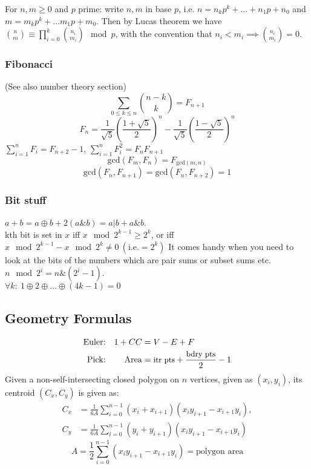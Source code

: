 \documentclass[
	a4paper,
	landscape,
	10pt,
]{article}
\begin{document}
\begin{multicols}{3}
		For $n, m \geq 0$ and $p$ prime: write $n, m$ in base $p$, i.e.
		$n = n_k p^k + \dots + n_1 p + n_0$ and $m = m_k p^k + \dots m_1 p + m_0$. Then
		by Lucas theorem we have $\binom{n}{m} \equiv \prod_{i=0}^k \binom{n_i}{m_i}
		\mod p$, with the convention that $n_i < m_i \implies \binom{n_i}{m_i} =0$.

		\subsubsection*{Fibonacci} (See also number theory section) \\
 		$$\sum_{0 \leq k \leq n} \binom{n-k}{k} = F_{n+1}$$ 
		$$F_n = \frac{1}{\sqrt{5}} \left(\frac{1+\sqrt{5}}{2}\right)^n - \frac{1}{\sqrt{5}}\left(\frac{1-\sqrt{5}}{2}\right)^n$$
		$\sum_{i=1}^{n} {F_i} = F_{n+2}-1$, $\sum_{i=1}^{n} {F_i^2} = F_{n}F_{n+1}$
		$$\text{gcd}(F_m, F_n) = F_{\text{gcd}(m, n)}$$
		$$\text{gcd}(F_n, F_{n+1}) = \text{gcd}(F_n, F_{n+2}) = 1$$

		\subsubsection*{Bit stuff} $a + b = a \oplus b + 2(a\&b) = a | b + a\&b$. \\
		kth bit is set in $x$ iff $x \mod 2^{k-1} \geq 2^k$, or iff $x \mod 2^{k-1}  - x \mod 2^k \neq 0~(\text{i.e.} = 2^k)$ It comes handy when you need to look at the bits of the numbers which are pair sums or subset sums etc. \\
		$n \mod 2^i = n\&(2^i-1)$. \\
		$\forall k:~ 1 \oplus 2 \oplus \hdots \oplus (4k-1) = 0$


		\subsection{Geometry Formulas}
		\begin{align*}
			\textrm{Euler:}&&  1 + CC &= V - E + F\\
            \textrm{Pick:}&& \textrm{Area} &= {\small \textrm{itr pts}
            + \frac{\textrm{bdry pts}}2 - 1}
		\end{align*}
		Given a non-self-intersecting closed polygon on $n$ vertices, given as $(x_i, y_i)$, its centroid $(C_x, C_y)$ is given as:
		\begin{align*}
			C_x &= \frac{1}{6A} \sum_{i = 0}^{n - 1} (x_i + x_{i+1}) (x_i y_{i+1} - x_{i+1} y_i), \\
			C_y &= \frac{1}{6A} \sum_{i = 0}^{n - 1} (y_i + y_{i+1}) (x_i y_{i+1} - x_{i+1} y_i)
		\end{align*}
		\begin{equation*}
			A = \frac{1}{2} \sum_{i = 0}^{n - 1} (x_i y_{i+1} - x_{i+1} y_i) = \textrm{polygon area}
		\end{equation*}


\end{multicols}
\end{document}
